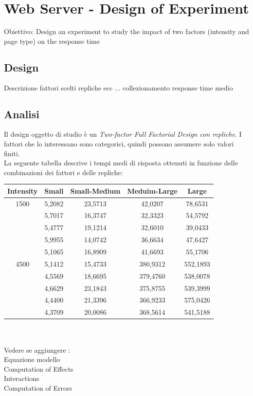 \chapter{Web Server - Design of Experiment}
Obiettivo: Design an experiment to study the impact of two factors (intensity and page type) on the response time
\section{Design}
Descrizione fattori scelti repliche ecc ...
collezionamento response time medio
\section{Analisi}
Il design oggetto di studio è un \textit{Two-factor Full Factorial Design con repliche}.
I fattori che lo interessano sono categorici, quindi possono assumere solo valori finiti. 
\\La seguente tabella descrive i tempi medi di risposta ottenuti in funzione delle combinazioni dei fattori e delle repliche:
\\
\begin{table}[h]
	\begin{center}
		\begin{tabular}{|c|c|c|c|c|}
			\hline
			Intensity & Small & Small-Medium & Meduim-Large & Large\\
			\hline
			\rule[-4mm]{0mm}{0.5cm}
			1500 & 5,2082 & 23,5713 & 42,0207 & 78,6531\\
			\rule[-4mm]{0mm}{0.5cm}
			& 5,7017 & 16,3747 & 32,3323 & 54,5792\\
			\rule[-4mm]{0mm}{0.5cm}
			& 5,4777 & 19,1214 & 32,6010 & 39,0433\\
			\rule[-4mm]{0mm}{0.5cm}
			& 5,9955 & 14,0742 & 36,6634 & 47,6427\\	
			\rule[-4mm]{0mm}{0.5cm}
			& 5,1065 & 16,8909 & 41,6693 & 55,1706\\ 
			\hline
			\rule[-0.5cm]{0mm}{0.5cm}
			4500 & 5,1412 & 15,4733 & 380,9312 & 552,1893\\
			\rule[-0.5cm]{0mm}{0.5cm}
			& 4,5569 & 18,6695 & 379,4760 & 538,0078\\
			\rule[-0.5cm]{0mm}{0.5cm}
			& 4,6629 & 23,1843 & 375,8755 & 539,3999\\
			\rule[-0.5cm]{0mm}{0.5cm}
			& 4,4400 & 21,3396 & 366,9233 & 575,0426\\	
			\rule[-0.5cm]{0mm}{0.5cm}
			& 4,3709 & 20,0086 & 368,5614 & 541,5188\\
			\hline
		\end{tabular}
	\end{center}
\end{table}
\\
\\
Vedere se aggiungere :
\\Equazione modello
\\Computation of Effects
\\Interactions
\\Computation of Errors
